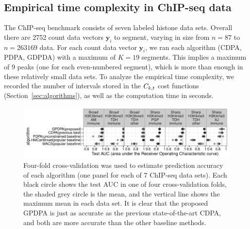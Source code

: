 \documentclass{article}
\begin{document}

\subsection{Empirical time complexity in ChIP-seq data}
\label{sec:results_time}

The ChIP-seq benchmark consists of seven labeled histone data
sets.
Overall there are 2752 count data vectors $\mathbf y_i$ to segment,
varying in size from $n=87$ to $n=263169$ data. For each count data
vector $\mathbf y_i$, we ran each algorithm (CDPA, PDPA, GDPDA) with a
maximum of $K=19$ segments. This implies a maximum of 9 peaks (one for
each even-numbered segment), which is more than enough in these
relatively small data sets. To analyze the empirical time complexity,
we recorded the number of intervals stored in the $C_{k,t}$ cost
functions (Section~\ref{sec:algorithms}), as well as the computation
time in seconds.


\begin{figure}[t!]
  \centering
  \includegraphics[width=\textwidth]{figure-test-error-dots}
  \vskip -0.5cm
  \caption{Four-fold cross-validation was used to estimate prediction
    accuracy of each algorithm (one panel for each of 7 ChIP-seq data sets). 
Each black circle shows the test AUC in one of four
    cross-validation folds, the shaded grey circle is the mean, and
    the vertical line shows the maximum mean in each data set. It is
    clear that the proposed GPDPA is
    just as accurate as the previous state-of-the-art CDPA, and both are
    more accurate than the other baseline methods. 
  }
  \label{fig:test-error-dots}
\end{figure}
\end{document}

